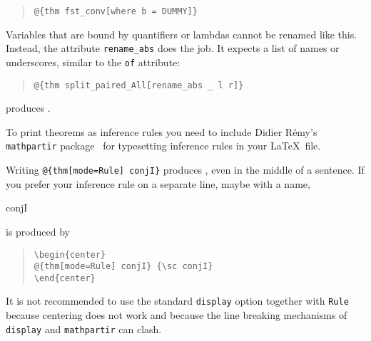\begin{isabellebody}
\begin{isamarkuptext}
\begin{quote}
\verb!@!\verb!{thm fst_conv[where b = DUMMY]}!
\end{quote}
Variables that are bound by quantifiers or lambdas cannot be renamed
like this. Instead, the attribute \texttt{rename\_abs} does the
job. It expects a list of names or underscores, similar to the
\texttt{of} attribute:
\begin{quote}
\verb!@!\verb!{thm split_paired_All[rename_abs _ l r]}!
\end{quote}
produces .%
\end{isamarkuptext}%
\isamarkuptrue%
%
\isamarkuptrue%
%
\begin{isamarkuptext}%
To print theorems as inference rules you need to include Didier
R\'emy's \texttt{mathpartir} package~\cite{mathpartir}
for typesetting inference rules in your \LaTeX\ file.

Writing \verb!@!\verb!{thm[mode=Rule] conjI}! produces
, even in the middle of a sentence.
If you prefer your inference rule on a separate line, maybe with a name,
\begin{center}
 {\sc conjI}
\end{center}
is produced by
\begin{quote}
\verb!\begin{center}!\\
\verb!@!\verb!{thm[mode=Rule] conjI} {\sc conjI}!\\
\verb!\end{center}!
\end{quote}
It is not recommended to use the standard \texttt{display} option
together with \texttt{Rule} because centering does not work and because
the line breaking mechanisms of \texttt{display} and \texttt{mathpartir} can
clash.


\end{isamarkuptext}
\end{isabellebody}
